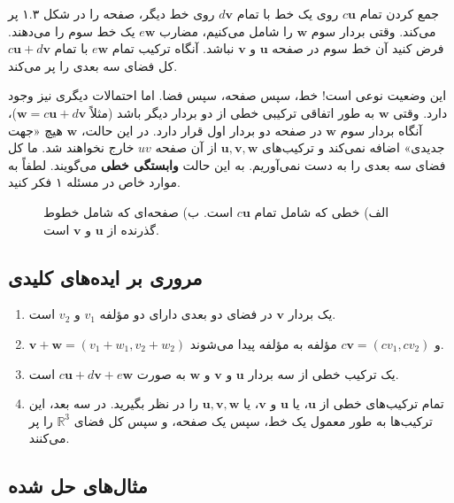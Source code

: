 \documentclass[12pt, a4paper]{book}
\begin{document}
	جمع کردن تمام $c\mathbf{u}$ روی یک خط با تمام $d\mathbf{v}$ روی خط دیگر، صفحه را در شکل ۱.۳ پر می‌کند. وقتی بردار سوم $\mathbf{w}$ را شامل می‌کنیم، مضارب $e\mathbf{w}$ یک خط سوم را می‌دهند. فرض کنید آن خط سوم در صفحه $\mathbf{u}$ و $\mathbf{v}$ نباشد. آنگاه ترکیب تمام $e\mathbf{w}$ با تمام $c\mathbf{u} + d\mathbf{v}$ کل فضای سه بعدی را پر می‌کند.
	
	این وضعیت نوعی است! خط، سپس صفحه، سپس فضا. اما احتمالات دیگری نیز وجود دارد. وقتی $\mathbf{w}$ به طور اتفاقی ترکیبی خطی از دو بردار دیگر باشد (مثلاً $\mathbf{w} = c\mathbf{u} + d\mathbf{v}$)، آنگاه بردار سوم $\mathbf{w}$ در صفحه دو بردار اول قرار دارد. در این حالت، $\mathbf{w}$ هیچ «جهت جدیدی» اضافه نمی‌کند و ترکیب‌های $\mathbf{u}, \mathbf{v}, \mathbf{w}$ از آن صفحه $uv$ خارج نخواهند شد. ما کل فضای سه بعدی را به دست نمی‌آوریم. به این حالت \textbf{وابستگی خطی} می‌گویند. لطفاً به موارد خاص در مسئله ۱ فکر کنید.
	
	\begin{figure}[h!]
		\centering
		\caption{الف) خطی که شامل تمام $c\mathbf{u}$ است. ب) صفحه‌ای که شامل خطوط گذرنده از $\mathbf{u}$ و $\mathbf{v}$ است.}
	\end{figure}
	
	\newpage
	\subsection*{مروری بر ایده‌های کلیدی}
	\begin{enumerate}
		\item یک بردار $\mathbf{v}$ در فضای دو بعدی دارای دو مؤلفه $v_1$ و $v_2$ است.
		\item $\mathbf{v} + \mathbf{w} = (v_1+w_1, v_2+w_2)$ و $c\mathbf{v} = (cv_1, cv_2)$ مؤلفه به مؤلفه پیدا می‌شوند.
		\item یک ترکیب خطی از سه بردار $\mathbf{u}$ و $\mathbf{v}$ و $\mathbf{w}$ به صورت $c\mathbf{u} + d\mathbf{v} + e\mathbf{w}$ است.
		\item تمام ترکیب‌های خطی از $\mathbf{u}$، یا $\mathbf{u}$ و $\mathbf{v}$، یا $\mathbf{u}, \mathbf{v}, \mathbf{w}$ را در نظر بگیرید. در سه بعد، این ترکیب‌ها به طور معمول یک خط، سپس یک صفحه، و سپس کل فضای $\mathbb{R}^3$ را پر می‌کنند.
	\end{enumerate}
	
	\subsection*{مثال‌های حل شده}
\end{document}
